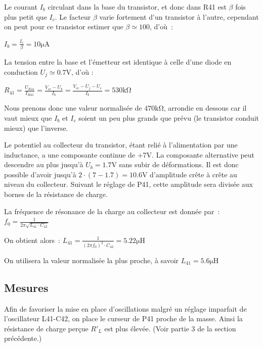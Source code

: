 \documentclass{article}
\begin{document}
Le courant $I_b$ circulant dans la base du transistor, et donc dans R41 est $\beta$ fois plus petit que $I_c$.
Le facteur $\beta$ varie fortement d'un transistor à l'autre, cependant on peut pour ce transistor estimer que $\beta \simeq 100$, d'où~:
\begin{center}
$I_b = \frac{I_c}{\beta} = 10\mathrm{\mu A}$
\end{center}

La tension entre la base et l'émetteur est identique à celle d'une diode en conduction $U_j \simeq 0.7$V, d'où :
\begin{center}
$R_{41} = \frac{U_{R41}}{I_{R41}} = \frac{V_{cc} - U_b}{I_b} = \frac{V_{cc} - U_j - U_e}{I_b} = 530\mathrm{k\Omega}$
\end{center}

Nous prenons donc une valeur normalisée de $470\mathrm{k\Omega}$, arrondie en dessous car il vaut mieux que $I_b$ et $I_c$ soient un peu plus grands que prévu (le transistor conduit mieux) que l'inverse.




Le potentiel au collecteur du transistor, étant relié à l'alimentation par une inductance, a une composante continue de +7V.
La composante alternative peut descendre au plus jusqu'à ${U_b = 1.7\mathrm{V}}$ sans subir de déformations. Il est donc possible d'avoir jusqu'à ${2\cdot(7-1.7)=10.6\mathrm{V}}$ d'amplitude crête à crête au niveau du collecteur.
Suivant le réglage de P41, cette amplitude sera divisée aux bornes de la résistance de charge.


La fréquence de résonance de la charge au collecteur est donnée par~: $f_0 = \frac{1}{2\pi \sqrt{L_{41} \cdot C_{42}}}$

On obtient alors~: $L_{41} = \frac{1}{(2\pi f_0)^2 \cdot C_{42}} = 5.22 \mathrm{\mu H}$

On utilisera la valeur normalisée la plus proche, à savoir $L_{41} = 5.6 \mathrm{\mu H}$

\subsection{Mesures}


Afin de favoriser la mise en place d'oscillations malgré un réglage imparfait de l'oscillateur L41-C42, on place le curseur de P41 proche de la masse. Ainsi la résistance de charge perçue $R'_L$ est plus élevée. (Voir partie 3 de la section précédente.)
\end{document}

